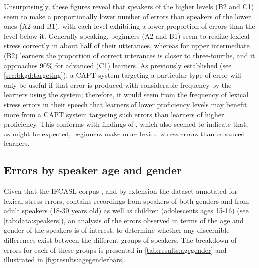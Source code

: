 			
	Unsurprisingly, these figures reveal that  speakers of the higher levels (B2 and C1) seem to make a proportionally lower number of errors than speakers of the lower ones (A2 and B1), with each level exhibiting a lower proportion of errors than the level below it. Generally speaking, beginners  (A2 and B1) seem to realize lexical stress correctly in about half of their utterances, whereas for upper intermediate (B2) learners the proportion of correct utterances is closer to three-fourths, and it approaches 90\% for advanced (C1) learners. As previously established (see \cref{sec:bkgd:targeting}), a CAPT system targeting a particular type of error will only be useful if that error is produced with considerable frequency by the learners using the system; therefore, it would seem from the frequency of lexical stress errors in their speech that learners of lower proficiency levels may benefit more from a CAPT system targeting such errors than learners of higher proficiency. 
			This conforms with findings of \textcite{Michaux2012}, which also seemed to indicate that, as might be expected, beginners make more lexical stress errors than advanced learners.
			
			
		
		\subsection{Errors by speaker age and gender}
		\label{sec:results:agegender}
			
			
			Given that the IFCASL corpus \citep{Fauth2014,Trouvain2013}, and by extension the dataset annotated for lexical stress errors, contains recordings from speakers of both genders and from adult speakers (18-30 years old) as well as children (adolescents ages 15-16) (see \cref{tab:data:speakers}), an analysis of the errors observed in terms of the age and gender of the speakers is of interest, to determine whether any discernible differences exist between the different groups of speakers. The breakdown of errors for each of these groups is presented in \cref{tab:results:agegender} and illustrated in \cref{fig:results:agegenderbars}.
			
